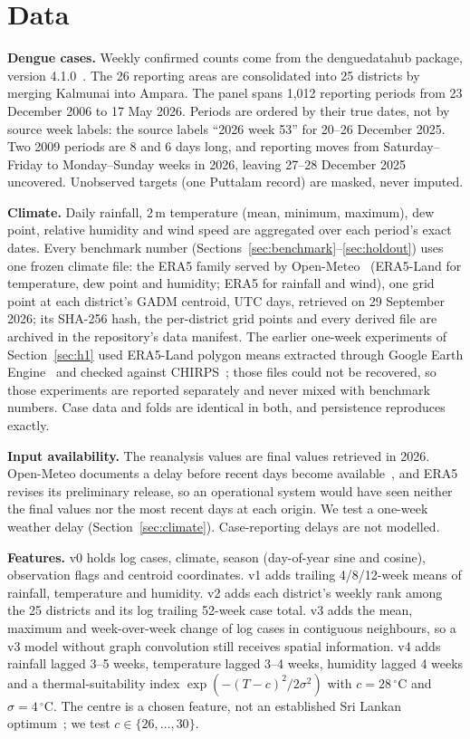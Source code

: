 \section{Data}
\label{sec:data}

\textbf{Dengue cases.} Weekly confirmed counts come from the denguedatahub package, version 4.1.0~\cite{talagala2026denguedatahub}. The 26 reporting areas are consolidated into 25 districts by merging Kalmunai into Ampara. The panel spans 1{,}012 reporting periods from 23 December 2006 to 17 May 2026. Periods are ordered by their true dates, not by source week labels: the source labels ``2026 week 53'' for 20--26 December 2025. Two 2009 periods are 8 and 6 days long, and reporting moves from Saturday--Friday to Monday--Sunday weeks in 2026, leaving 27--28 December 2025 uncovered. Unobserved targets (one Puttalam record) are masked, never imputed.

\textbf{Climate.} Daily rainfall, 2\,m temperature (mean, minimum, maximum), dew point, relative humidity and wind speed are aggregated over each period's exact dates. Every benchmark number (Sections~\ref{sec:benchmark}--\ref{sec:holdout}) uses one frozen climate file: the ERA5 family served by Open-Meteo~\cite{openmeteo2026historical} (ERA5-Land for temperature, dew point and humidity; ERA5 for rainfall and wind), one grid point at each district's GADM centroid, UTC days, retrieved on 29 September 2026; its SHA-256 hash, the per-district grid points and every derived file are archived in the repository's data manifest. The earlier one-week experiments of Section~\ref{sec:h1} used ERA5-Land polygon means extracted through Google Earth Engine~\cite{munoz2021era5land} and checked against CHIRPS~\cite{funk2015chirps}; those files could not be recovered, so those experiments are reported separately and never mixed with benchmark numbers. Case data and folds are identical in both, and persistence reproduces exactly.

\textbf{Input availability.} The reanalysis values are final values retrieved in 2026. Open-Meteo documents a delay before recent days become available~\cite{openmeteo2026historical}, and ERA5 revises its preliminary release, so an operational system would have seen neither the final values nor the most recent days at each origin. We test a one-week weather delay (Section~\ref{sec:climate}). Case-reporting delays are not modelled.

\textbf{Features.} v0 holds log cases, climate, season (day-of-year sine and cosine), observation flags and centroid coordinates. v1 adds trailing 4/8/12-week means of rainfall, temperature and humidity. v2 adds each district's weekly rank among the 25 districts and its log trailing 52-week case total. v3 adds the mean, maximum and week-over-week change of log cases in contiguous neighbours, so a v3 model without graph convolution still receives spatial information. v4 adds rainfall lagged 3--5 weeks, temperature lagged 3--4 weeks, humidity lagged 4 weeks and a thermal-suitability index $\exp(-(T-c)^2/2\sigma^2)$ with $c=28\,^\circ$C and $\sigma=4\,^\circ$C. The centre is a chosen feature, not an established Sri Lankan optimum~\cite{mordecai2017temperature}; we test $c\in\{26,\dots,30\}$.

